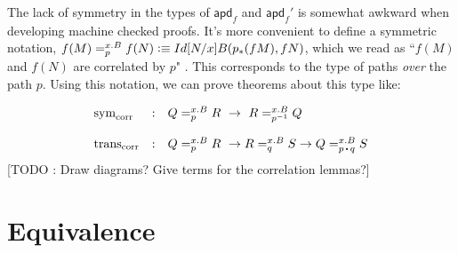 \documentclass[12pt]{article}
\newcommand{\apd}{\mathsf{apd}}
\begin{document}
The lack of symmetry in the types of $\apd_f$ and $\apd_f'$ is somewhat awkward
when developing machine checked proofs. It's more convenient to define a
symmetric notation, $f(M) =_p^{x. B} f(N) \vcentcolon\equiv Id{[N/x]B}(p_* (f M), f N)$,
which we read as ``$f(M)$ and $f(N)$ are correlated by $p$" . This corresponds
to the type of paths \emph{over} the path $p$. Using this notation, we 
can prove theorems about this type like:


\[
\begin{array}{lcl}
\text{sym}_{\text{corr}} & : & Q =_p^{x.B} R \ \to \ R =_{p^{-1}}^{x.B} Q \\
\\
\text{trans}_{\text{corr}} & : & Q =_p^{x.B} R \ \to R =_q^{x.B} S \to Q =_{p \concat q}^{x.B} S 
\end{array}
\]
%
[TODO : Draw diagrams? Give terms for the correlation lemmas?]

\section{Equivalence}



\end{document}
